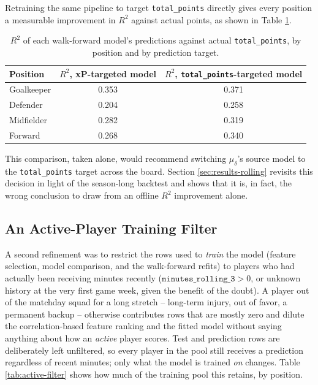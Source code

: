 				Retraining the same pipeline to target \texttt{total\_points} directly gives every position a measurable improvement in $R^2$ against actual points, as shown in Table \ref{tab:xp-vs-points-r2}.

				\begin{table}[H]
					\begin{center}
						\begin{tabular}{|l|c|c|}
							\hline
							Position & $R^2$, xP-targeted model & $R^2$, \texttt{total\_points}-targeted model \\
							\hline
							Goalkeeper & 0.353 & 0.371 \\
							\hline
							Defender & 0.204 & 0.258 \\
							\hline
							Midfielder & 0.282 & 0.319 \\
							\hline
							Forward & 0.268 & 0.340 \\
							\hline
						\end{tabular}
					\end{center}
					\caption{$R^2$ of each walk-forward model's predictions against actual \texttt{total\_points}, by position and by prediction target.}
					\label{tab:xp-vs-points-r2}
				\end{table}

				This comparison, taken alone, would recommend switching $\mu_\delta$'s source model to the \texttt{total\_points} target across the board. Section \ref{sec:results-rolling} revisits this decision in light of the season-long backtest and shows that it is, in fact, the wrong conclusion to draw from an offline $R^2$ improvement alone.

			\subsection{An Active-Player Training Filter}
				A second refinement was to restrict the rows used to \emph{train} the model (feature selection, model comparison, and the walk-forward refits) to players who had actually been receiving minutes recently ($\texttt{minutes\_rolling\_3} > 0$, or unknown history at the very first game week, given the benefit of the doubt). A player out of the matchday squad for a long stretch -- long-term injury, out of favor, a permanent backup -- otherwise contributes rows that are mostly zero and dilute the correlation-based feature ranking and the fitted model without saying anything about how an \emph{active} player scores. Test and prediction rows are deliberately left unfiltered, so every player in the pool still receives a prediction regardless of recent minutes; only what the model is trained \emph{on} changes. Table \ref{tab:active-filter} shows how much of the training pool this retains, by position.

